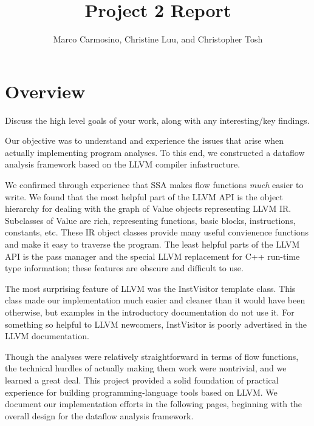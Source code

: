 \documentclass{article}
\title{Project 2 Report}
\author{Marco Carmosino, Christine Luu, and Christopher Tosh}
\theoremstyle{definition}
\begin{document}
\maketitle

\section{Overview}
\begin{framed}
  Discuss the high level goals of your work, along with any
  interesting/key findings.
\end{framed}

Our objective was to understand and experience the issues that arise
when actually implementing program analyses. To this end, we
constructed a dataflow analysis framework based on the LLVM compiler
infastructure.

We confirmed through experience that SSA makes flow functions
\emph{much} easier to write. We found that the most helpful part of
the LLVM API is the object hierarchy for dealing with the graph of
Value objects representing LLVM IR. Subclasses of Value are rich,
representing functions, basic blocks, instructions, constants,
etc. These IR object classes provide many useful convienence functions
and make it easy to traverse the program. The least helpful parts of
the LLVM API is the pass manager and the special LLVM replacement for
C++ run-time type information; these features are obscure and
difficult to use.

The most surprising feature of LLVM was the InstVisitor template
class. This class made our implementation much easier and cleaner than
it would have been otherwise, but examples in the introductory
documentation do not use it. For something so helpful to LLVM
newcomers, InstVisitor is poorly advertised in the LLVM documentation.

Though the analyses were relatively straightforward in terms of flow
functions, the technical hurdles of actually making them work were
nontrivial, and we learned a great deal. This project provided a solid
foundation of practical experience for building programming-language
tools based on LLVM. We document our implementation efforts in the
following pages, beginning with the overall design for the dataflow
analysis framework. 

\end{document}

